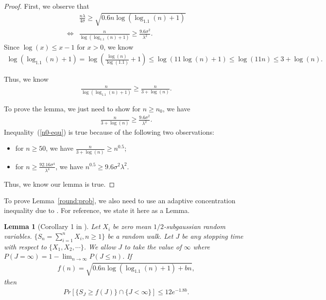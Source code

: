 \documentclass[twoside,11pt]{article}
\newtheorem{lemma}{Lemma}
\begin{document}
\begin{proof}
First, we observe that
\begin{align}
&\frac{n\lambda}{4\sigma}\geq \sqrt{0.6n\log(\log_{1.1}(n)+1)} \nonumber \\
\iff &\frac{n}{\log(\log_{1.1}(n)+1)}\geq \frac{9.6\sigma^2}{\lambda^2}. \nonumber 
\end{align}
Since $\log(x)\leq x-1$ for $x>0$, we know 
\begin{align}
\log(\log_{1.1}(n)+1)=\log\left(\frac{\log(n)}{\log(1.1)}+1\right)\leq \log(11\log(n)+1)\leq \log(11n)\leq 3+\log(n). \nonumber
\end{align}

Thus, we know
\begin{align}
\frac{n}{\log(\log_{1.1}(n)+1)}\geq \frac{n}{3+\log(n)}. \nonumber 
\end{align}

To prove the lemma, we just need to show for $n\geq n_{0}$, we have
\begin{align}
\frac{n}{3+\log(n)}\geq \frac{9.6\sigma^2}{\lambda^2}. \label{n0-equ}
\end{align}
Inequality~(\ref{n0-equ}) is true because of the following two observations:
\begin{itemize}
\item for $n\geq 50$, we have $\frac{n}{3+\log(n)}\geq n^{0.5}$;
\item for $n\geq \frac{92.16\sigma^4}{\lambda^4}$, we have $n^{0.5}\geq {9.6\sigma^{2}}{\lambda^{2}}$.
\end{itemize}

Thus, we know our lemma is true.

\end{proof}

To prove Lemma~\ref{round:prob}, we also need to use an adaptive concentration inequality due to \cite{zhao2016adaptive}. For reference, we state it here as a Lemma.

\begin{lemma}[Corollary 1 in \cite{zhao2016adaptive}]
Let $X_{i}$ be zero mean $1/2$-subgaussian random variables. $\{S_{n}=\sum_{i=1}^{n}X_{i},n\geq 1\}$ be a random walk. Let $J$ be any stopping time with respect to $\{X_1,X_2,\cdots\}$. We allow $J$ to take the value of $\infty$ where $P(J=\infty)=1-\lim_{n\rightarrow \infty}P(J\leq n)$. If
\begin{align}
f(n)=\sqrt{0.6n\log(\log_{1.1}(n)+1)+bn}, \nonumber
\end{align}
then
\begin{align}
Pr[\{S_{J}\geq f(J)\}\cap \{J<\infty\}]\leq 12e^{-1.8b}. \nonumber
\end{align}
\label{ACI-inequality}
\end{lemma}
\end{document}
